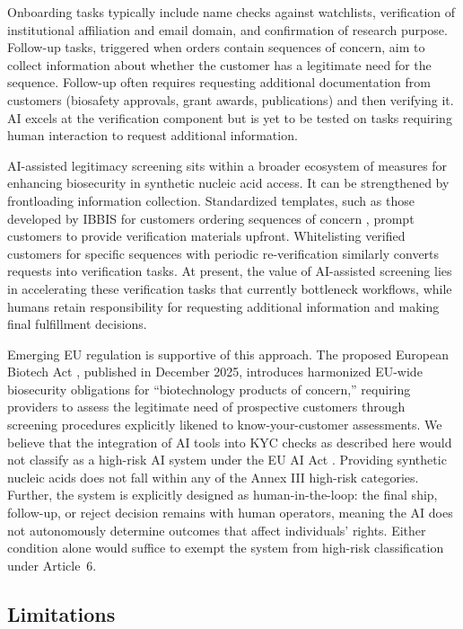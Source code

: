 \documentclass[utf8]{FrontiersinHarvard}
\begin{document}
Onboarding tasks typically include name checks against watchlists, verification of institutional affiliation and email domain, and confirmation of research purpose. Follow-up tasks, triggered when orders contain sequences of concern, aim to collect information about whether the customer has a legitimate need for the sequence. Follow-up often requires requesting additional documentation from customers (biosafety approvals, grant awards, publications) and then verifying it. AI excels at the verification component but is yet to be tested on tasks requiring human interaction to request additional information.

AI-assisted legitimacy screening sits within a broader ecosystem of measures for enhancing biosecurity in synthetic nucleic acid access. It can be strengthened by frontloading information collection. Standardized templates, such as those developed by IBBIS for customers ordering sequences of concern \citep{IBBIS2025}, prompt customers to provide verification materials upfront. Whitelisting verified customers for specific sequences with periodic re-verification \citep{Crawford2024} similarly converts requests into verification tasks. At present, the value of AI-assisted screening lies in accelerating these verification tasks that currently bottleneck workflows, while humans retain responsibility for requesting additional information and making final fulfillment decisions.

Emerging EU regulation is supportive of this approach. The proposed European Biotech Act \citep{EUBiotechAct2025}, published in December 2025, introduces harmonized EU-wide biosecurity obligations for ``biotechnology products of concern,'' requiring providers to assess the legitimate need of prospective customers through screening procedures explicitly likened to know-your-customer assessments. We believe that the integration of AI tools into KYC checks as described here would not classify as a high-risk AI system under the EU AI Act \citep{EUAIAct2024}. Providing synthetic nucleic acids does not fall within any of the Annex III high-risk categories. Further, the system is explicitly designed as human-in-the-loop: the final ship, follow-up, or reject decision remains with human operators, meaning the AI does not autonomously determine outcomes that affect individuals' rights. Either condition alone would suffice to exempt the system from high-risk classification under Article~6.

\subsection{Limitations}
\end{document}
